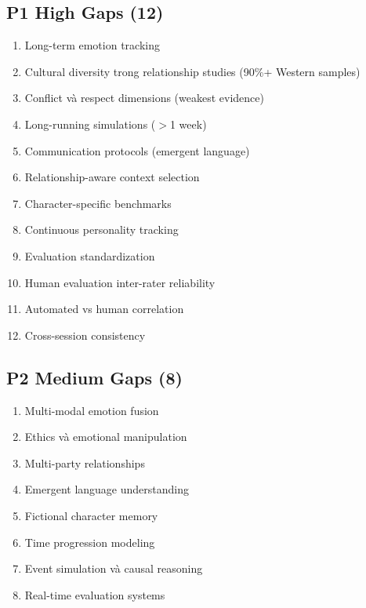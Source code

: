 \subsection{P1 High Gaps (12)}

\begin{enumerate}
    \item Long-term emotion tracking
    \item Cultural diversity trong relationship studies (90\%+ Western samples)
    \item Conflict và respect dimensions (weakest evidence)
    \item Long-running simulations ($>$1 week)
    \item Communication protocols (emergent language)
    \item Relationship-aware context selection
    \item Character-specific benchmarks
    \item Continuous personality tracking
    \item Evaluation standardization
    \item Human evaluation inter-rater reliability
    \item Automated vs human correlation
    \item Cross-session consistency
\end{enumerate}

\subsection{P2 Medium Gaps (8)}

\begin{enumerate}
    \item Multi-modal emotion fusion
    \item Ethics và emotional manipulation
    \item Multi-party relationships
    \item Emergent language understanding
    \item Fictional character memory
    \item Time progression modeling
    \item Event simulation và causal reasoning
    \item Real-time evaluation systems
\end{enumerate}

